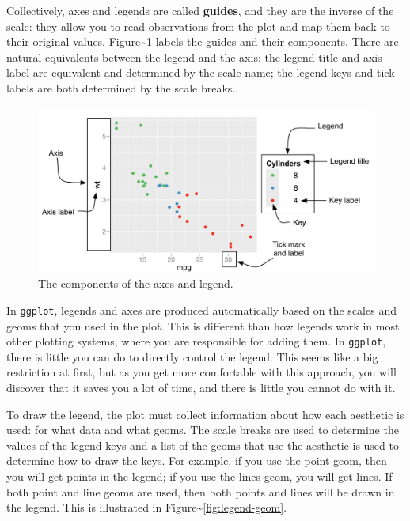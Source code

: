 
Collectively, axes and legends are called \textbf{guides}, and they are
the inverse of the scale: they allow you to read observations from the
plot and map them back to their original values.
Figure\textasciitilde{}\ref{fig:labelled-guides} labels the guides and
their components. There are natural equivalents between the legend and
the axis: the legend title and axis label are equivalent and determined
by the scale name; the legend keys and tick labels are both determined
by the scale breaks. 

\begin{figure}[htbp]
  \centering
  \includegraphics[width=\linewidth]{diagrams/scale-guides}
  \caption{The components of the axes and legend.}
  \label{fig:labelled-guides}
\end{figure}

In \texttt{ggplot}, legends and axes are produced automatically based on
the scales and geoms that you used in the plot. This is different than
how legends work in most other plotting systems, where you are
responsible for adding them. In \texttt{ggplot}, there is little you can
do to directly control the legend.  This seems like a big
restriction at first, but as you get more comfortable with this
approach, you will discover that it saves you a lot of time, and there
is little you cannot do with it.

To draw the legend, the plot must collect information about how each
aesthetic is used: for what data and what geoms. The scale breaks are
used to determine the values of the legend keys and a list of the geoms
that use the aesthetic is used to determine how to draw the keys. For
example, if you use the point geom, then you will get points in the
legend; if you use the lines geom, you will get lines. If both point and
line geoms are used, then both points and lines will be drawn in the
legend. This is illustrated in
Figure\textasciitilde{}\ref{fig:legend-geom}.

